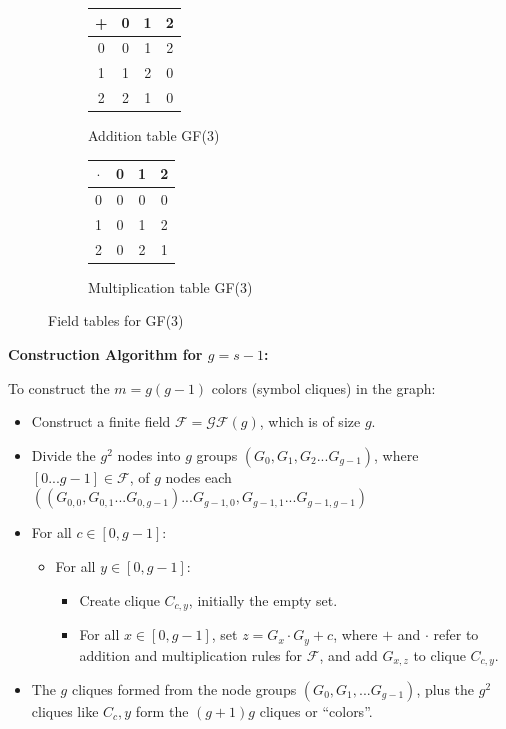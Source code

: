 \documentclass[11pt, oneside]{article} 	%
\begin{document}
\begin{figure}[!htb]
\centering
\begin{subfigure}{.3\textwidth}
 \centering
 \begin{tabular}{c | c c c}
  + & 0 & 1 & 2 \\
\hline
  0 & 0 & 1 & 2 \\
  1 & 1 & 2 & 0 \\
  2 & 2 & 1 & 0 \\
  \end{tabular}
 \caption{Addition table GF(3)}
\label{fig:gf3-add}
\end{subfigure}
\begin{subfigure}{.3\textwidth}
 \centering
\begin{tabular}{c | c c c}
  $\cdot$ & 0 & 1 & 2 \\
\hline
  0 & 0 & 0 & 0 \\
  1 & 0 & 1 & 2 \\
  2 & 0 & 2 & 1 \\

\end{tabular}
\caption{Multiplication table GF(3)}
\label{fig:gf3-mult}
\end{subfigure}
\caption{Field tables for GF(3)}
\label{fig:gf3-tables}
\end{figure}

\begin{framed}
\textbf{Construction Algorithm for $g=s-1$:}

To construct the $m = g(g-1)$ colors (symbol cliques) in the graph:
\begin{itemize}
 \item Construct a finite field $\mathcal{F} = \mathcal{GF}(g) $, which is of size $g$.
 \item Divide the $g^2$ nodes into $g$ groups $(G_0, G_1, G_2 ... G_{g-1})$, where $[0...g-1] \in \mathcal{F}$, of $g$ nodes each $((G_{0,0}, G_{0,1}...G_{0,g-1}) ...G_{g-1,0}, G_{g-1,1}...G_{g-1,g-1})$
 \item For all $c \in [0,g-1]$: 
 \begin{itemize}
 \item For all $y \in [0,g-1]$: 
 \begin{itemize}
  \item Create clique $C_{c,y}$, initially the empty set.
  \item For all $x \in [0,g-1]$, set $z = G_x \cdot G_y + c$, where $+$ and $\cdot$ refer to addition and multiplication rules for $\mathcal{F}$, and add $G_{x, z}$ to clique $C_{c, y}$.
  \end{itemize}
 \end{itemize}
 \item The $g$ cliques formed from the node groups $(G_0, G_1, ... G_{g-1})$, plus the $g^2$ cliques like $C_c, y$ form the $(g+1)g$ cliques or ``colors''.
\end{itemize}
\end{framed}
\end{document}
